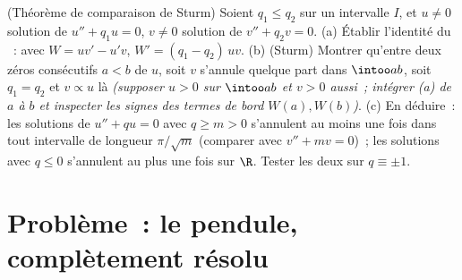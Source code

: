 \begin{exercise}[$\star\star\star$]\label{exo:b3:ode:12}
(Théorème de comparaison de Sturm) Soient $q_1 \leq q_2$
 sur un intervalle $I$, et $u \neq 0$ solution de
$u'' + q_1u = 0$, $v \neq 0$ solution de $v'' + q_2v = 0$.
(a) Établir l'identité du ~: avec $W = uv' - u'v$,
$W' = (q_1 - q_2)\,uv$.
(b) (Sturm) Montrer qu'entre deux zéros consécutifs $a < b$
de $u$, soit $v$ s'annule quelque part dans $\intoo ab$, soit
$q_1 = q_2$ et $v \propto u$ là \emph{(supposer $u > 0$ sur
$\intoo ab$ et $v > 0$ aussi~; intégrer (a) de $a$ à $b$ et
inspecter les signes des termes de bord $W(a), W(b)$)}.
(c) En déduire~: les solutions de $u'' + qu = 0$ avec $q \geq
m > 0$ s'annulent au moins une fois dans tout intervalle de
longueur $\pi/\sqrt m$ (comparer avec $v'' + mv = 0$)~; les
solutions avec $q \leq 0$ s'annulent au plus une fois sur
$\R$. Tester les deux sur $q \equiv \pm1$.
\end{exercise}

\section{Problème~: le pendule, complètement résolu}

